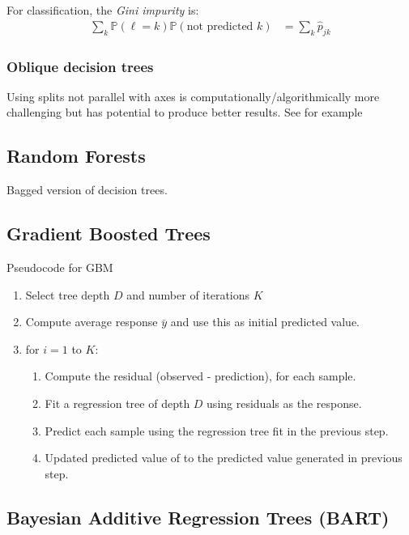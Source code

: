 \documentclass[12pt]{article}
\newcommand{\PP}{\ensuremath{\mathbb{P}}}
\begin{document}
\cite[\S9.2.3]{esl} For classification, the {\sl Gini impurity} is:
\begin{align*}
  \sum_k
\PP(\ell=k) \PP(\text{not predicted } k) & = \sum_k \hat p_{jk}
\end{align*}

\subsubsection{Oblique decision trees}

Using splits not parallel with axes is computationally/algorithmically more
challenging but has potential to produce better results. See for example \cite{Murthy_1994.}

\subsection{Random Forests}

Bagged version of decision trees.

\subsection{Gradient Boosted Trees}

Pseudocode for GBM \cite{CASI,}
\begin{enumerate}
\item Select tree depth $D$ and number of iterations $K$
\item Compute average response $\bar y$ and use this as initial predicted value.
\item for $i = 1$ to $K$:
  \begin{enumerate}
  \item Compute the residual (observed - prediction), for each sample.
  \item Fit a regression tree of depth $D$ using residuals as the response.
  \item Predict each sample using the regression tree fit in the previous step.
  \item Updated predicted value of to the predicted value generated in previous step.
  \end{enumerate}
\end{enumerate}



\subsection{Bayesian Additive Regression Trees (BART)}
\end{document}
